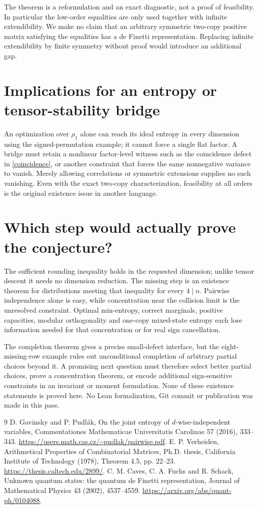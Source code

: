 \documentclass[11pt]{article}
\begin{document}
The theorem is a reformulation and an exact diagnostic, not a proof
of feasibility. In particular the low-order equalities are only used
together with infinite extendibility. We make no claim that an
arbitrary symmetric two-copy positive matrix satisfying the equalities
has a de Finetti representation. Replacing infinite extendibility by
finite symmetry without proof would introduce an additional gap.

\section{Implications for an entropy or tensor-stability bridge}
An optimization over $\rho_1$ alone can reach its ideal entropy in
every dimension using the signed-permutation example; it cannot
force a single flat factor. A bridge must retain a nonlinear
factor-level witness such as the coincidence defect in
\eqref{coincidence}, or another constraint that forces the same
nonnegative variance to vanish. Merely allowing correlations or
symmetric extensions supplies no such vanishing. Even with the exact
two-copy characterization, feasibility at all orders is the original
existence issue in another language.


\section{Which step would actually prove the conjecture?}
The sufficient rounding inequality holds in the requested dimension;
unlike tensor descent it needs no dimension reduction. The missing
step is an existence theorem for distributions meeting that inequality
for every $4\mid n$. Pairwise independence alone is easy, while
concentration near the collision limit is the unresolved constraint.
Optimal min-entropy, correct marginals, positive capacities, modular
orthogonality and one-copy mixed-state entropy each lose information
needed for that concentration or for real sign cancellation.

The completion theorem gives a precise small-defect interface, but
the eight-missing-row example rules out unconditional completion of
arbitrary partial choices beyond it. A promising next question must
therefore select better partial choices, prove a concentration theorem,
or encode additional sign-sensitive constraints in an invariant or
moment formulation. None of these existence statements is proved here.
No Lean formalization, Git commit or publication was made in this pass.

\begin{thebibliography}{9}
 D. Gavinsky and P. Pudl\'ak,
On the joint entropy of $d$-wise-independent variables,
Commentationes Mathematicae Universitatis Carolinae 57 (2016), 333--343.
\url{https://users.math.cas.cz/~pudlak/pairwise.pdf}.
 E. P. Verheiden,
Arithmetical Properties of Combinatorial Matrices, Ph.D. thesis,
California Institute of Technology (1978), Theorem 4.5, pp. 22--23.
\url{https://thesis.caltech.edu/2899/}.
 C. M. Caves, C. A. Fuchs and R. Schack,
Unknown quantum states: the quantum de Finetti representation,
Journal of Mathematical Physics 43 (2002), 4537--4559.
\url{https://arxiv.org/abs/quant-ph/0104088}.
\end{thebibliography}
\end{document}
